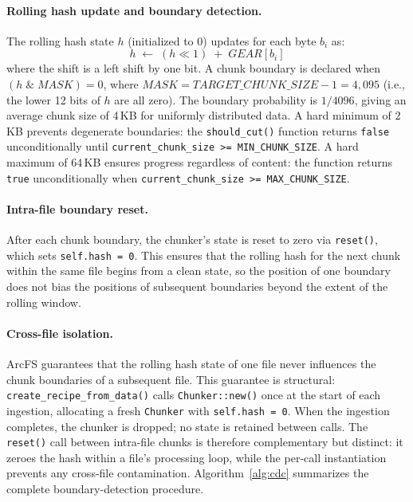 \documentclass[journal]{IEEEtran}
\begin{document}
\paragraph{Rolling hash update and boundary detection.}
The rolling hash state $h$ (initialized to 0) updates for each byte
$b_i$ as:
\begin{equation}
  h \;\leftarrow\; (h \ll 1) \;+\; \mathit{GEAR}[b_i]
  \label{eq:gear}
\end{equation}
where the shift is a left shift by one bit.  A chunk boundary is
declared when $(h \;\&\; \mathit{MASK}) = 0$, where
$\mathit{MASK} = \mathit{TARGET\_CHUNK\_SIZE} - 1 = 4{,}095$ (i.e., the
lower 12 bits of $h$ are all zero).  The boundary probability is
$1/4096$, giving an average chunk size of 4\,KB for uniformly distributed
data.  A hard minimum of 2\,KB prevents degenerate boundaries: the
\texttt{should\_cut()} function returns \texttt{false} unconditionally
until \texttt{current\_chunk\_size >= MIN\_CHUNK\_SIZE}.  A hard maximum
of 64\,KB ensures progress regardless of content: the function returns
\texttt{true} unconditionally when \texttt{current\_chunk\_size >= MAX\_CHUNK\_SIZE}.

\paragraph{Intra-file boundary reset.}
After each chunk boundary, the chunker's state is reset to zero via
\texttt{reset()}, which sets \texttt{self.hash = 0}.  This ensures that
the rolling hash for the next chunk within the same file begins from a
clean state, so the position of one boundary does not bias the positions
of subsequent boundaries beyond the extent of the rolling window.

\paragraph{Cross-file isolation.}
ArcFS guarantees that the rolling hash state of one file never influences
the chunk boundaries of a subsequent file.  This guarantee is structural:
\texttt{create\_recipe\_from\_data()} calls \texttt{Chunker::new()} once
at the start of each ingestion, allocating a fresh \texttt{Chunker}
with \texttt{self.hash = 0}.  When the ingestion completes, the chunker
is dropped; no state is retained between calls.  The \texttt{reset()}
call between intra-file chunks is therefore complementary but
distinct: it zeroes the hash within a file's processing loop, while
the per-call instantiation prevents any cross-file contamination.
Algorithm~\ref{alg:cdc} summarizes the complete boundary-detection
procedure.
\end{document}
